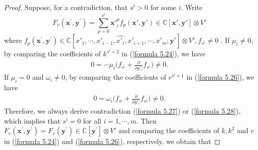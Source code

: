 \documentclass[12pt,reqno]{amsart}
\def\C{\mathbb{C}}
\numberwithin{equation}{section}
\begin{document}
\begin{proof}
Suppose, for a contradiction, that $s^i>0$ for some $i$.
Write $$F_v(\boldsymbol{x^\prime},\boldsymbol{y^\prime})=\sum_{p=0}^{s^i}\boldsymbol{x'}_i^pf_p(\boldsymbol{x'},\boldsymbol{y'})\in\C[\boldsymbol{x'},\boldsymbol{y'}]\otimes V' 
$$
 where $f_{p}(\boldsymbol{x^\prime},\boldsymbol{y^\prime})\in\C[x'_1,\cdots,x'_{i-1},\widehat{x'_i},x'_{i+1},\cdots,x'_m;\boldsymbol{y'}]\otimes V', f_{s^i}\neq0$ 
 . If $\mu_i\ne 0$, by comparing the coefficients of $k^{s^i+2}$ in (\ref{formula 5.24}), we have
\begin{equation}\label{formula 5.27}
\begin{aligned}
0=-\mu_i\Bigg( f_{s^i}+\frac{\partial}{\partial{y'_i}}f_{s^i}    \Bigg)\neq0.
\end{aligned}
\end{equation}
If $\mu_i=0$ and $\omega_i\ne0$, 
by comparing the coefficients of $r^{s^i+1}$ in (\ref{formula 5.26}), we have
\begin{equation}\label{formula 5.28}
\begin{aligned}
0=\omega_i\Bigg( f_{s^i}+\frac{\partial}{\partial{y'_i}}f_{s^i}    \Bigg)\neq0.
\end{aligned}
\end{equation}
Therefore, we always derive contradiction (\ref{formula 5.27}) or (\ref{formula 5.28}), which implies that $s^i=0$ for all $i=1,\cdots,m$.  Then $F_v(\boldsymbol{x^\prime},\boldsymbol{y^\prime})=F_v(\boldsymbol{y^\prime})\in\C[\boldsymbol{y^\prime}]\otimes V'$ and comparing the coefficients of $k,k^2$ and $r$ in (\ref{formula 5.24}) and (\ref{formula 5.26}), respectively, we obtain that


\end{proof}
\end{document}

